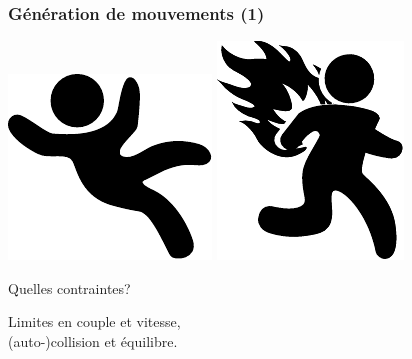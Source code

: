 \documentclass[14pt,utf8x,hyperref={pdfpagelabels=false}]{beamer}
\begin{document}
\begin{slideDecision}
  \frametitle{Génération de mouvements (1)}
  \begin{changeleftmargin}{1.1cm}
  \begin{center}
    \includegraphics[width=.25\paperheight]{src/slides/falling.pdf}%
    \includegraphics[width=.25\paperheight]{src/slides/burning.pdf}\par
    \bigskip
    Quelles contraintes?\par
  \end{center}
  Limites en couple et vitesse,\\
  (auto-)collision et \alert{équilibre}.
  \end{changeleftmargin}
\end{slideDecision}
\end{document}
